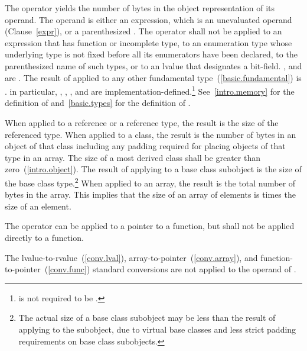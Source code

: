 \pnum
{}%
%
%
The  operator yields the number of bytes in the object
representation of its operand. The operand is either an expression,
which is an unevaluated operand (Clause~\ref{expr}), or a parenthesized
.
%
The  operator shall not be applied to an expression that
has function or incomplete type, to an enumeration type whose underlying type is not fixed before all
its enumerators have been declared, to the parenthesized name of such
types, or to an lvalue that designates a bit-field.
,  and
 are . The result of
 applied to any other fundamental
type~(\ref{basic.fundamental}) is .
\enternote 
in particular, , ,
, and  are
implementation-defined.\footnote{ is not required to be .}
\exitnote 
\enternote 
See~\ref{intro.memory} for the definition of 
and~\ref{basic.types} for the definition of .
\exitnote 

\pnum
{}%
When applied to a reference or a reference type, the result is the size
of the referenced type.
%
When applied to a class, the result is the number of bytes in an object
of that class including any padding required for placing objects of that
type in an array. The size of a most derived class shall be greater than
zero~(\ref{intro.object}). The result of applying  to a
base class subobject is the size of the base class type.\footnote{The actual
size of a base class subobject may be less than the result of
applying  to the subobject, due to virtual base classes
and less strict padding requirements on base class subobjects.}
%
When applied to an array, the result is the total number of bytes in the
array. This implies that the size of an array of  elements is
 times the size of an element.

\pnum
The  operator can be applied to a pointer to a function,
but shall not be applied directly to a function.

\pnum
The lvalue-to-rvalue~(\ref{conv.lval}),
array-to-pointer~(\ref{conv.array}), and
function-to-pointer~(\ref{conv.func}) standard conversions are not
applied to the operand of .

